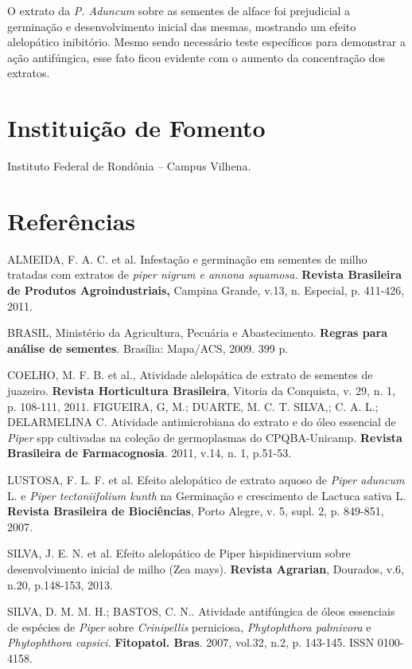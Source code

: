 \documentclass[article,12pt,onesidea,4paper,english,brazil]{abntex2}
\begin{document}
	O extrato da \textit{P. Aduncum} sobre as sementes de alface foi prejudicial a germinação e desenvolvimento inicial das mesmas, mostrando um efeito alelopático inibitório. Mesmo sendo necessário teste específicos para demonstrar a ação antifúngica, esse fato ficou evidente com o aumento da concentração dos extratos.
	
	\section*{Instituição de Fomento}
	
	Instituto Federal de Rondônia – Campus Vilhena.
	
	\section*{Referências}
	
	\noindent ALMEIDA, F. A. C. et al. Infestação e germinação em sementes de milho tratadas com extratos de \textit{piper nigrum e annona squamosa.} \textbf{Revista Brasileira de Produtos Agroindustriais,} Campina Grande, v.13, n. Especial, p. 411-426, 2011.
	
	\noindent BRASIL, Ministério da Agricultura, Pecuária e Abastecimento. \textbf{Regras para análise de sementes}. Brasília: Mapa/ACS, 2009. 399 p.
	
	\noindent COELHO, M. F. B. et al., Atividade alelopática de extrato de sementes de juazeiro. \textbf{Revista Horticultura Brasileira}, Vitoria da Conquista, v. 29, n. 1, p. 108-111, 2011. FIGUEIRA, G, M.; DUARTE, M. C. T. SILVA,; C. A. L.; DELARMELINA C. Atividade antimicrobiana do extrato e do óleo essencial de \textit{Piper} spp cultivadas na coleção de germoplasmas do CPQBA-Unicamp. \textbf{Revista Brasileira de Farmacognosia}. 2011, v.14, n. 1, p.51-53.
	
	\noindent LUSTOSA, F. L. F. et al. Efeito alelopático de extrato aquoso de \textit{Piper aduncum} L. e \textit{Piper tectoniifolium kunth} na Germinação e crescimento de Lactuca sativa L. \textbf{Revista Brasileira de Biociências}, Porto Alegre, v. 5, supl. 2, p. 849-851, 2007.
	
	\noindent SILVA, J. E. N. et al. Efeito alelopático de Piper hispidinervium sobre desenvolvimento inicial de milho (Zea mays). \textbf{Revista Agrarian}, Dourados, v.6, n.20, p.148-153, 2013.
	
	\noindent SILVA, D. M. M. H.; BASTOS, C. N.. Atividade antifúngica de óleos essenciais de espécies de \textit{Piper} sobre \textit{Crinipellis} perniciosa, \textit{Phytophthora palmivora} e \textit{Phytophthora capsici}. \textbf{Fitopatol. Bras}. 2007, vol.32, n.2, p. 143-145. ISSN 0100- 4158.
	
\end{document}
